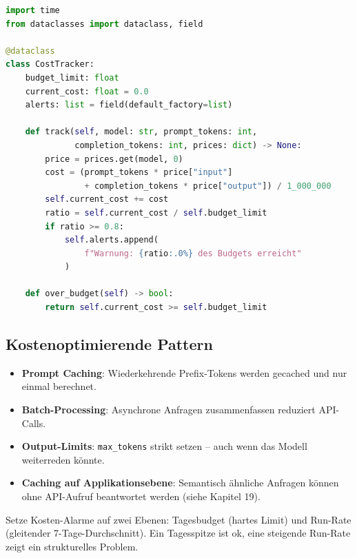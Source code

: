 \begin{lstlisting}[language=Python,caption=Kosten-Tracker für LLM-API-Aufrufe]
import time
from dataclasses import dataclass, field

@dataclass
class CostTracker:
    budget_limit: float
    current_cost: float = 0.0
    alerts: list = field(default_factory=list)

    def track(self, model: str, prompt_tokens: int,
              completion_tokens: int, prices: dict) -> None:
        price = prices.get(model, 0)
        cost = (prompt_tokens * price["input"]
                + completion_tokens * price["output"]) / 1_000_000
        self.current_cost += cost
        ratio = self.current_cost / self.budget_limit
        if ratio >= 0.8:
            self.alerts.append(
                f"Warnung: {ratio:.0%} des Budgets erreicht"
            )

    def over_budget(self) -> bool:
        return self.current_cost >= self.budget_limit
\end{lstlisting}

\subsection{Kostenoptimierende Pattern}

\begin{itemize}[leftmargin=*]
    \item \textbf{Prompt Caching}: Wiederkehrende Prefix-Tokens werden gecached und nur einmal berechnet.
    \item \textbf{Batch-Processing}: Asynchrone Anfragen zusammenfassen reduziert API-Calls.
    \item \textbf{Output-Limits}: \texttt{max\_tokens} strikt setzen -- auch wenn das Modell weiterreden könnte.
    \item \textbf{Caching auf Applikationsebene}: Semantisch ähnliche Anfragen können ohne API-Aufruf beantwortet werden (siehe Kapitel 19).
\end{itemize}

\begin{praxishinweis}
Setze Kosten-Alarme auf zwei Ebenen: Tagesbudget (hartes Limit) und Run-Rate (gleitender 7-Tage-Durchschnitt). Ein Tagesspitze ist ok, eine steigende Run-Rate zeigt ein strukturelles Problem.
\end{praxishinweis}

